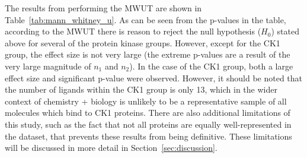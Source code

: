 \documentclass[11pt]{article}
\begin{document}
The results from performing the MWUT are shown in Table~\ref{tab:mann_whitney_u}. 
As can be seen from the p-values in the table, according to the MWUT there is reason to reject the null hypothesis ($H_0$) stated above for several of the protein kinase groups. 
However, except for the CK1 group, the effect size is not very large (the extreme p-values are a result of the very large magnitude of $n_1$ and $n_2$). 
In the case of the CK1 group, both a large effect size and significant p-value were observed. 
However, it should be noted that the number of ligands within the CK1 group is only 13, which in the wider context of chemistry + biology is unlikely to be a representative sample of all molecules which bind to CK1 proteins. 
There are also additional limitations of this study, such as the fact that not all proteins are equally well-represented in the dataset, that prevents these results from being definitive. 
These limitations will be discussed in more detail in Section~\ref{sec:discussion}. 
\end{document}

